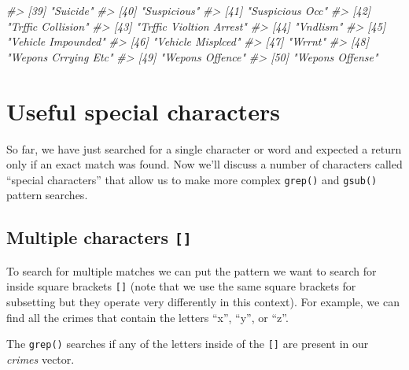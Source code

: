 \documentclass[
  12pt,
]{book}
\newenvironment{Shaded}{\begin{snugshade}}{\end{snugshade}}
\newcommand{\CommentTok}[1]{\textcolor[rgb]{0.37,0.37,0.37}{\textit{#1}}}
\begin{document}
\begin{Shaded}
\begin{Highlighting}[]
\CommentTok{\#> [39] "Suicide"                                }
\CommentTok{\#> [40] "Suspicious"                             }
\CommentTok{\#> [41] "Suspicious Occ"                         }
\CommentTok{\#> [42] "Trffic Collision"                       }
\CommentTok{\#> [43] "Trffic Violtion Arrest"                 }
\CommentTok{\#> [44] "Vndlism"                                }
\CommentTok{\#> [45] "Vehicle Impounded"                      }
\CommentTok{\#> [46] "Vehicle Misplced"                       }
\CommentTok{\#> [47] "Wrrnt"                                  }
\CommentTok{\#> [48] "Wepons Crrying Etc"                     }
\CommentTok{\#> [49] "Wepons Offence"                         }
\CommentTok{\#> [50] "Wepons Offense"}
\end{Highlighting}
\end{Shaded}

\hypertarget{useful-special-characters}{%
\section{Useful special characters}\label{useful-special-characters}}

So far, we have just searched for a single character or word and expected a return only if an exact match was found. Now we'll discuss a number of characters called ``special characters'' that allow us to make more complex \texttt{grep()} and \texttt{gsub()} pattern searches.

\hypertarget{multiple-characters}{%
\subsection{\texorpdfstring{Multiple characters \texttt{{[}{]}}}{Multiple characters {[}{]}}}\label{multiple-characters}}

To search for multiple matches we can put the pattern we want to search for inside square brackets \texttt{{[}{]}} (note that we use the same square brackets for subsetting but they operate very differently in this context). For example, we can find all the crimes that contain the letters ``x'', ``y'', or ``z''.

The \texttt{grep()} searches if any of the letters inside of the \texttt{{[}{]}} are present in our \emph{crimes} vector.
\end{document}
